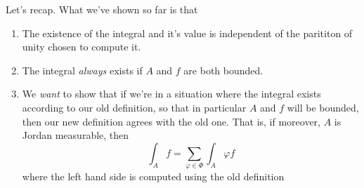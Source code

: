 \documentclass{article}
\begin{document}
Let's recap. What we've shown so far is that
\begin{enumerate}

  \item The existence of the integral and it's value is independent of the parititon of unity chosen to compute it.

  \item The integral \textit{always} exists if \(A\) and \(f\) are both bounded.

  \item We \textit{want} to show that if we're in a situation where the integral exists according to our old definition, so that in particular \(A\) and \(f\) will be bounded, then our new definition agrees with the old one. That is, if moreover, \(A\) is Jordan measurable, then
  \begin{equation}
    \int_Af = \sum_{\varphi \in \Phi}\int_A\varphi f
  \end{equation}
  where the left hand side is computed using the old definition
\end{enumerate}
\end{document}
